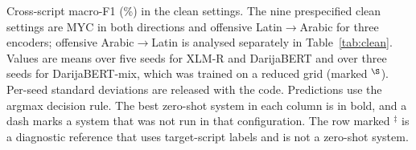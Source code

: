 \begin{table}[t]
\caption{Cross-script macro-F1 (\%) in the clean settings. The nine prespecified clean settings are MYC in both directions and offensive Latin$\to$Arabic for three encoders; offensive Arabic$\to$Latin is analysed separately in Table~\ref{tab:clean}. Values are means over five seeds for XLM-R and DarijaBERT and over three seeds for DarijaBERT-mix, which was trained on a reduced grid (marked $^{\S}$). Per-seed standard deviations are released with the code. Predictions use the argmax decision rule. The best zero-shot system in each column is in bold, and a dash marks a system that was not run in that configuration. The row marked $^{\ddagger}$ is a diagnostic reference that uses target-script labels and is not a zero-shot system.}
\label{tab:f1}
\centering\footnotesize
\setlength{\tabcolsep}{3.2pt}
\fitbox{\textwidth}
\end{table}
